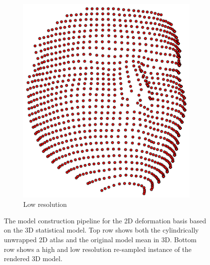 \begin{figure}
\begin{subfigure}[b]{0.13\textheight}
        \includegraphics[width=\textwidth]{face_flow/images/contour_snapping/example_instance_low}
        \caption{Low resolution}\label{subfig:face_flow_instance_low}
    \end{subfigure}
    \hspace*{\fill}
    \caption{The model construction pipeline for the 2D deformation basis based
             on the 3D statistical model. Top row shows both the cylindrically 
             unwrapped 2D atlas and the original model mean in 3D. Bottom row
             shows a high and low resolution re-sampled instance of the rendered
             3D model.}
\label{fig:face_flow_3d_model_instance}
\end{figure}

